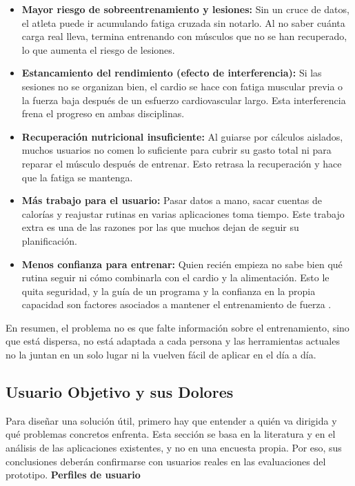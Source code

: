 \begin{itemize} \item \textbf{Mayor riesgo de sobreentrenamiento y lesiones:} Sin un cruce de datos, el atleta puede ir acumulando fatiga cruzada sin notarlo. Al no saber cuánta carga real lleva, termina entrenando con músculos que no se han recuperado, lo que aumenta el riesgo de lesiones.


\item \textbf{Estancamiento del rendimiento (efecto de interferencia):} Si las sesiones no se organizan bien, el cardio se hace con fatiga muscular previa o la fuerza baja después de un esfuerzo cardiovascular largo. Esta interferencia frena el progreso en ambas disciplinas.

  \item \textbf{Recuperación nutricional insuficiente:} Al guiarse por cálculos aislados, muchos usuarios no comen lo suficiente para cubrir su gasto total ni para reparar el músculo después de entrenar. Esto retrasa la recuperación y hace que la fatiga se mantenga.

  \item \textbf{Más trabajo para el usuario:} Pasar datos a mano, sacar cuentas de calorías y reajustar rutinas en varias aplicaciones toma tiempo. Este trabajo extra es una de las razones por las que muchos dejan de seguir su planificación.

  \item \textbf{Menos confianza para entrenar:} Quien recién empieza no sabe bien qué rutina seguir ni cómo combinarla con el cardio y la alimentación. Esto le quita seguridad, y la guía de un programa y la confianza en la propia capacidad son factores asociados a mantener el entrenamiento de fuerza \citep{rhodes2017resistance}.
\end{itemize}

En resumen, el problema no es que falte información sobre el entrenamiento, sino que está dispersa, no está adaptada a cada persona y las herramientas actuales no la juntan en un solo lugar ni la vuelven fácil de aplicar en el día a día.
\subsection{Usuario Objetivo y sus Dolores}
Para diseñar una solución útil, primero hay que entender a quién va dirigida y qué problemas concretos enfrenta. Esta sección se basa en la literatura y en el análisis de las aplicaciones existentes, y no en una encuesta propia. Por eso, sus conclusiones deberán confirmarse con usuarios reales en las evaluaciones del prototipo.
\newpage
\textbf{Perfiles de usuario}

